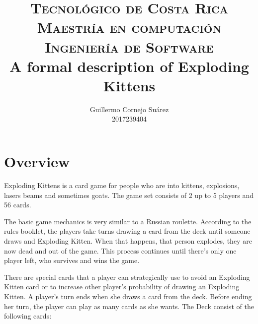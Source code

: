 \documentclass[11pt, fuzz]{article}
\title{		
		\usefont{OT1}{bch}{b}{n}
        \Large \textsc{Tecnológico de Costa Rica} \\
		\normalsize \textsc{Maestría en computación} \\ 
		\normalsize \textsc{Ingeniería de Software} \\ [25pt]		
		\Huge A formal description of Exploding Kittens \\	
}
\author{
		\normalfont \Large   Guillermo Cornejo Suárez \\ 		
        \large		 		 2017239404 \\ 		        
}
\begin{document}
\maketitle

\section{Overview}

Exploding Kittens is a card game for people who are into kittens, explosions, lasers beams and sometimes goats. The game set consists of 2 up to 5 players and 56 cards. 

The basic game mechanics is very similar to a Russian roulette. According to the rules booklet, the players take turns drawing a card from the deck until someone draws and Exploding Kitten. When that happens, that person explodes, they are now dead and out of the game. This process continues until there's only one player left, who survives and wins the game. 

There are special cards that a player can strategically use to avoid an Exploding Kitten card or to increase other player's probability of drawing an Exploding Kitten. A player's turn ends when she draws a card from the deck. Before ending her turn, the player can play as many cards as she wants. The Deck consist of the following cards: 
\end{document}
